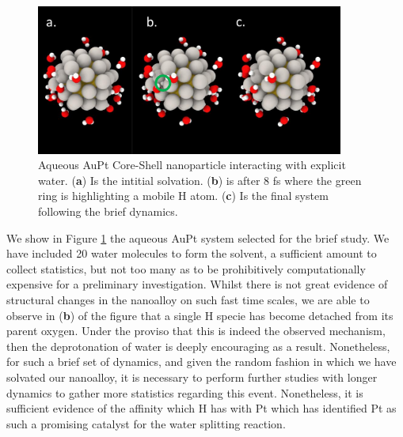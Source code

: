 \begin{figure}[h!]
    \centering
    \includegraphics[width=0.9\textwidth]{figures/AuPtSolv.pdf}
    \caption{Aqueous AuPt Core-Shell nanoparticle interacting with explicit water. (\textbf{a}) Is the intitial solvation. (\textbf{b}) is after 8 fs where the green ring is highlighting a mobile H atom. (\textbf{c}) Is the final system following the brief dynamics.}
    \label{fig:CS_Solv_im}
\end{figure}

We show in Figure \ref{fig:CS_Solv_im} the aqueous AuPt system selected for the brief study. We have included 20 water molecules to form the solvent, a sufficient amount to collect statistics, but not too many as to be prohibitively computationally expensive for a preliminary investigation. Whilst there is not great evidence of structural changes in the nanoalloy on such fast time scales, we are able to observe in (\textbf{b}) of the figure that a single H specie has become detached from its parent oxygen. Under the proviso that this is indeed the observed mechanism, then the deprotonation of water is deeply encouraging as a result. Nonetheless, for such a brief set of dynamics, and given the random fashion in which we have solvated our nanoalloy, it is necessary to perform further studies with longer dynamics to gather more statistics regarding this event. Nonetheless, it is sufficient evidence of the affinity which H has with Pt which has identified Pt as such a promising catalyst for the water splitting reaction.



